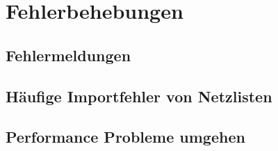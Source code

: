 \section{Fehlerbehebungen}
\subsection{Fehlermeldungen}
\subsection{Häufige Importfehler von Netzlisten}
\subsection{Performance Probleme umgehen}